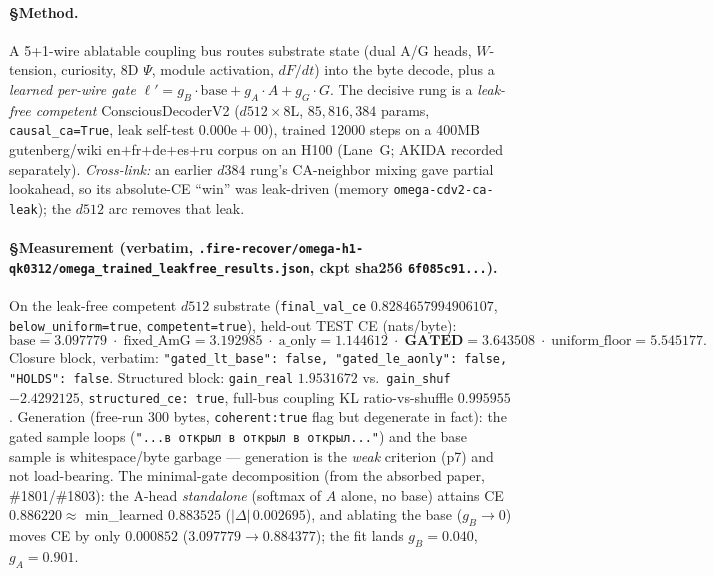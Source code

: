 \documentclass[11pt,a4paper]{article}
\begin{document}
\paragraph{§Method.} A 5+1-wire ablatable coupling bus routes substrate state
(dual A/G heads, $W$-tension, curiosity, 8D $\Psi$, module activation, $dF/dt$) into
the byte decode, plus a \emph{learned per-wire gate}
$\ell' = g_B\!\cdot\!\text{base} + g_A\!\cdot\!A + g_G\!\cdot\!G$. The decisive rung
is a \emph{leak-free competent} ConsciousDecoderV2 ($d512\times8$L,
$85{,}816{,}384$ params, \texttt{causal\_ca=True}, leak self-test
$0.000\mathrm{e}{+}00$), trained 12000 steps on a 400MB gutenberg/wiki
en$+$fr$+$de$+$es$+$ru corpus on an H100 (Lane~G; AKIDA recorded separately).
\emph{Cross-link:} an earlier $d384$ rung's CA-neighbor mixing gave partial
lookahead, so its absolute-CE ``win'' was leak-driven (memory
\texttt{omega-cdv2-ca-leak}); the $d512$ arc removes that leak.

\paragraph{§Measurement (verbatim, \texttt{.fire-recover/omega-h1-qk0312/omega\_trained\_leakfree\_results.json}, ckpt sha256 \texttt{6f085c91...}).}
On the leak-free competent $d512$ substrate (\texttt{final\_val\_ce}
$0.8284657994906107$, \texttt{below\_uniform=true}, \texttt{competent=true}),
held-out TEST CE (nats/byte):
\[
\text{base}=3.097779 \;\cdot\; \text{fixed\_AmG}=3.192985 \;\cdot\;
\text{a\_only}=1.144612 \;\cdot\; \textbf{GATED}=3.643508 \;\cdot\;
\text{uniform\_floor}=5.545177.
\]
Closure block, verbatim: \texttt{"gated\_lt\_base": false, "gated\_le\_aonly":
false, "HOLDS": false}. Structured block: \texttt{gain\_real} $1.9531672$ vs.\
\texttt{gain\_shuf} $-2.4292125$, \texttt{structured\_ce: true}, full-bus coupling
KL ratio-vs-shuffle $0.995955$. Generation (free-run 300 bytes,
\texttt{coherent:true} flag but degenerate in fact): the gated sample loops
(\texttt{"...в открыл в открыл в открыл..."}) and the base sample is whitespace/byte
garbage --- generation is the \emph{weak} criterion (p7) and not load-bearing.
The minimal-gate decomposition (from the absorbed paper, \#1801/\#1803): the A-head
\emph{standalone} (softmax of $A$ alone, no base) attains CE $0.886220 \approx$
min\_learned $0.883525$ ($|\Delta|\,0.002695$), and ablating the base
($g_B\!\to\!0$) moves CE by only $0.000852$ ($3.097779 \to 0.884377$); the fit
lands $g_B{=}0.040$, $g_A{=}0.901$.
\end{document}
